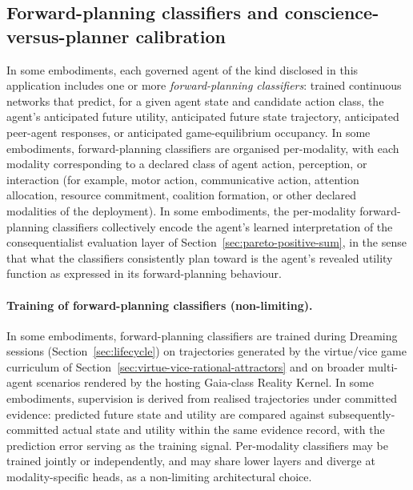 \documentclass[a4paper,12pt]{article}
\newcommand{\RK}{Reality Kernel\xspace}
\begin{document}
\subsection{Forward-planning classifiers and conscience-versus-planner
  calibration}
\label{sec:forward-planning-classifiers}

In some embodiments, each governed agent of the kind disclosed in
this application includes one or more \emph{forward-planning
classifiers}: trained continuous networks that predict, for a given
agent state and candidate action class, the agent's anticipated
future utility, anticipated future state trajectory, anticipated
peer-agent responses, or anticipated game-equilibrium occupancy. In
some embodiments, forward-planning classifiers are organised
per-modality, with each modality corresponding to a declared class of
agent action, perception, or interaction (for example, motor action,
communicative action, attention allocation, resource commitment,
coalition formation, or other declared modalities of the deployment).
In some embodiments, the per-modality forward-planning classifiers
collectively encode the agent's learned interpretation of the
consequentialist evaluation layer of
Section~\ref{sec:pareto-positive-sum}, in the sense that what the
classifiers consistently plan toward is the agent's revealed utility
function as expressed in its forward-planning behaviour.

\paragraph{Training of forward-planning classifiers (non-limiting).}
In some embodiments, forward-planning classifiers are trained during
Dreaming sessions (Section~\ref{sec:lifecycle}) on trajectories
generated by the virtue/vice game curriculum of
Section~\ref{sec:virtue-vice-rational-attractors} and on broader
multi-agent scenarios rendered by the hosting Gaia-class \RK. In some embodiments, supervision is derived from realised
trajectories under committed evidence: predicted future state and
utility are compared against subsequently-committed actual state and
utility within the same evidence record, with the prediction error
serving as the training signal. Per-modality classifiers may be
trained jointly or independently, and may share lower layers and
diverge at modality-specific heads, as a non-limiting architectural
choice.
\end{document}
